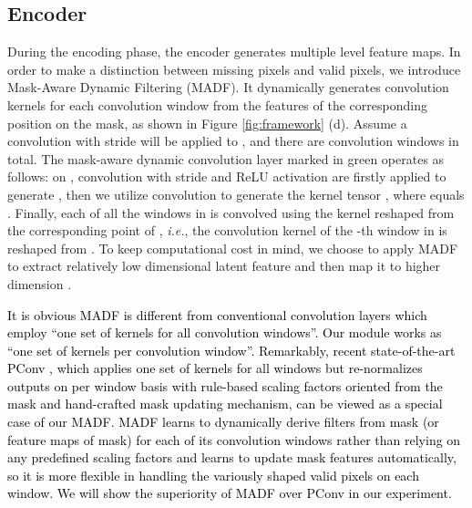 \documentclass[journal]{IEEEtran}
\begin{document}
{\color{black}{Fisrt of all, we describe the notations used in the following text.  and  are the mask feature map and the image feature map generated by our Mask-Aware Dynamic Filtering (MADF) module at the  level of encoder .  is the final encoded feature of the  level of . We use  and  to denote feature map at the  level of the recovery decoder  and the  refinement decoder . There are in total  levels in our model. Note that  and  are all equivalent to .  equals . We use  to denote number of feature channels of tensor  at level  and .}}



\subsection{Encoder}
During the encoding phase, the encoder  generates multiple level feature maps. 
In order to make a distinction between missing pixels and valid pixels, we introduce Mask-Aware Dynamic Filtering (MADF). It dynamically generates convolution kernels for each convolution window from the features of the corresponding position on the mask, as shown in Figure \ref{fig:framework} (d). Assume a  convolution with stride  will be applied to , and there are  convolution windows in total. The mask-aware dynamic convolution layer marked in green operates as follows: on ,  convolution with stride  and ReLU activation are firstly applied to generate , then we utilize  convolution to generate the kernel tensor , where  equals . Finally, each of all the  windows in  is convolved using the kernel reshaped from the corresponding point of , \textit{i.e.}, the convolution kernel of the -th window in  is reshaped from . 
To keep computational cost in mind, we choose to apply MADF to extract relatively low dimensional latent feature  and then map it to higher dimension . 


\textcolor{black}{  
It is obvious MADF is different from conventional convolution layers which employ ``one set of kernels for all convolution windows''. Our module works as ``one set of kernels per convolution window''. Remarkably, recent state-of-the-art PConv \cite{liu2018image}, which applies one set of kernels for all windows but re-normalizes outputs on per window basis with rule-based scaling factors oriented from the mask and hand-crafted mask updating mechanism, can be viewed as a special case of our MADF. MADF learns to dynamically derive filters from mask (or feature maps of mask) for each of its convolution windows rather than relying on any predefined scaling factors and learns to update mask features automatically, so it is more flexible in handling the variously shaped valid pixels on each window. We will show the superiority of MADF over PConv in our experiment.
}
\end{document}
